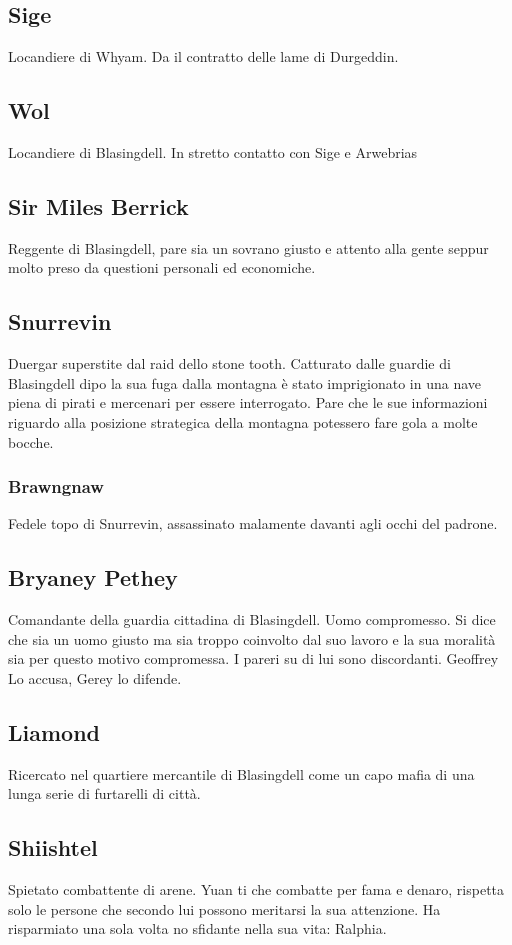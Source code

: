 \documentclass[10pt,twoside,twocolumn]{article}
\begin{document}
\subsection{Sige}\label{char:sige}
Locandiere di Whyam. Da il contratto delle lame di Durgeddin.
\subsection{Wol}\label{char:wol}
Locandiere di Blasingdell. In stretto contatto con Sige e Arwebrias
\subsection{Sir Miles Berrick}\label{char:milesberrick}
Reggente di Blasingdell, pare sia un sovrano giusto e attento alla gente
seppur molto preso da questioni personali ed economiche.
\subsection{Snurrevin}\label{char:snurrevin}
Duergar superstite dal raid dello stone tooth. Catturato dalle guardie di
Blasingdell dipo la sua fuga dalla montagna \`e stato imprigionato in una
nave piena di pirati e mercenari per essere interrogato. Pare che le
sue informazioni riguardo alla posizione strategica della montagna
potessero fare gola a molte bocche.
\subsubsection{Brawngnaw}\label{char:brawngnaw}
Fedele topo di Snurrevin, assassinato malamente davanti agli occhi del padrone.
\subsection{Bryaney Pethey}\label{char:bryaney}
Comandante della guardia cittadina di Blasingdell. Uomo compromesso. Si dice che
sia un uomo giusto ma sia troppo coinvolto dal suo lavoro e la sua moralit\`a
sia per questo motivo compromessa. I pareri su di lui sono discordanti. Geoffrey
Lo accusa, Gerey lo difende.
\subsection{Liamond}\label{char:liamond}
Ricercato nel quartiere mercantile di Blasingdell come un capo mafia di una
lunga serie di furtarelli di citt\`a.
\subsection{Shiishtel}\label{char:shiishtel}
Spietato combattente di arene. Yuan ti che combatte per fama e denaro, rispetta
solo le persone che secondo lui possono meritarsi la sua attenzione. Ha risparmiato una
sola volta no sfidante nella sua vita: Ralphia.
\end{document}
